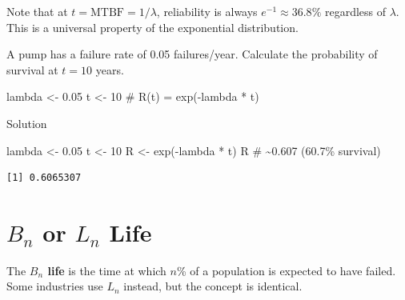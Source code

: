\documentclass[
  letterpaper,
  DIV=11,
  numbers=noendperiod]{scrreprt}
\newenvironment{Shaded}{\begin{snugshade}}{\end{snugshade}}
\newcommand{\CommentTok}[1]{\textcolor[rgb]{0.37,0.37,0.37}{#1}}
\newcommand{\DecValTok}[1]{\textcolor[rgb]{0.68,0.00,0.00}{#1}}
\newcommand{\FloatTok}[1]{\textcolor[rgb]{0.68,0.00,0.00}{#1}}
\newcommand{\FunctionTok}[1]{\textcolor[rgb]{0.28,0.35,0.67}{#1}}
\newcommand{\NormalTok}[1]{\textcolor[rgb]{0.00,0.23,0.31}{#1}}
\newcommand{\OtherTok}[1]{\textcolor[rgb]{0.00,0.23,0.31}{#1}}
\newcommand{\SpecialCharTok}[1]{\textcolor[rgb]{0.37,0.37,0.37}{#1}}
\begin{document}
Note that at \(t = \text{MTBF} = 1/\lambda\), reliability is always
\(e^{-1} \approx 36.8\%\) regardless of \(\lambda\). This is a universal
property of the exponential distribution.

\begin{tcolorbox}[enhanced jigsaw, arc=.35mm, bottomrule=.15mm, bottomtitle=1mm, breakable, colback=white, colbacktitle=quarto-callout-note-color!10!white, colframe=quarto-callout-note-color-frame, coltitle=black, left=2mm, leftrule=.75mm, opacityback=0, opacitybacktitle=0.6, rightrule=.15mm, title=\textcolor{quarto-callout-note-color}{\faInfo}\hspace{0.5em}{Try It}, titlerule=0mm, toprule=.15mm, toptitle=1mm]

A pump has a failure rate of 0.05 failures/year. Calculate the
probability of survival at \(t = 10\) years.

\begin{Shaded}
\begin{Highlighting}[]
\NormalTok{lambda }\OtherTok{\textless{}{-}} \FloatTok{0.05}
\NormalTok{t      }\OtherTok{\textless{}{-}} \DecValTok{10}
\CommentTok{\# R(t) = exp({-}lambda * t)}
\end{Highlighting}
\end{Shaded}

Solution

\begin{Shaded}
\begin{Highlighting}[]
\NormalTok{lambda }\OtherTok{\textless{}{-}} \FloatTok{0.05}
\NormalTok{t      }\OtherTok{\textless{}{-}} \DecValTok{10}
\NormalTok{R }\OtherTok{\textless{}{-}} \FunctionTok{exp}\NormalTok{(}\SpecialCharTok{{-}}\NormalTok{lambda }\SpecialCharTok{*}\NormalTok{ t)}
\NormalTok{R  }\CommentTok{\# \textasciitilde{}0.607 (60.7\% survival)}
\end{Highlighting}
\end{Shaded}

\begin{verbatim}
[1] 0.6065307
\end{verbatim}

\end{tcolorbox}

\section{\texorpdfstring{\(B_n\) or \(L_n\)
Life}{B\_n or L\_n Life}}\label{b_n-or-l_n-life}

The \textbf{\(B_n\) life} is the time at which \(n\)\% of a population
is expected to have failed. Some industries use \(L_n\) instead, but the
concept is identical.
\end{document}
